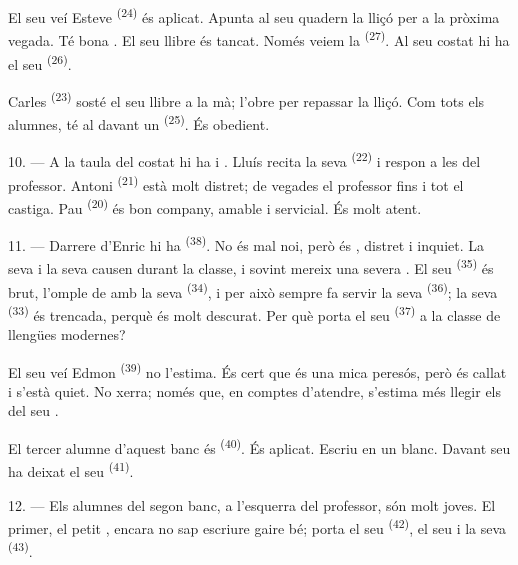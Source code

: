 El seu veí Esteve \textsuperscript{(24)} és aplicat. Apunta al seu quadern la
lliçó per a la pròxima vegada. Té bona . El seu llibre és tancat.
Només veiem la  \textsuperscript{(27)}. Al seu costat hi ha el
seu  \textsuperscript{(26)}.

Carles \textsuperscript{(23)} sosté el seu llibre a la mà; l'obre per repassar la
lliçó. Com tots els alumnes, té al davant un 
\textsuperscript{(25)}. És obedient.

10. --- A la taula del costat hi ha  i . Lluís
recita la seva  \textsuperscript{(22)} i respon a les
 del professor. Antoni \textsuperscript{(21)} està molt
distret; de vegades el professor fins i tot el castiga. Pau
\textsuperscript{(20)} és bon company, amable i servicial. És molt atent.

\VUsaut{4.2mm}
\VUsaut{3.2mm}

11. --- Darrere d'Enric hi ha  \textsuperscript{(38)}. No és mal
noi, però és , distret i inquiet. La seva  i
la seva  causen  durant la classe, i sovint
mereix una severa . El seu 
\textsuperscript{(35)} és brut, l'omple de  amb la seva
 \textsuperscript{(34)}, i per això sempre fa servir la seva
 \textsuperscript{(36)}; la seva 
\textsuperscript{(33)} és trencada, perquè és molt descurat. Per què porta el seu
 \textsuperscript{(37)} a la classe de llengües modernes?

El seu veí Edmon \textsuperscript{(39)} no l'estima. És cert que és una mica
peresós, però és callat i s'està quiet. No xerra; només que, en comptes
d'atendre, s'estima més llegir els  del seu .

El tercer alumne d'aquest banc és  \textsuperscript{(40)}. És
aplicat. Escriu en un  blanc. Davant seu ha deixat el seu
 \textsuperscript{(41)}.

12. --- Els alumnes del segon banc, a l'esquerra del professor, són molt joves.
El primer, el petit , encara no sap escriure gaire bé; porta el seu
 \textsuperscript{(42)}, el seu  i la
seva  \textsuperscript{(43)}.


